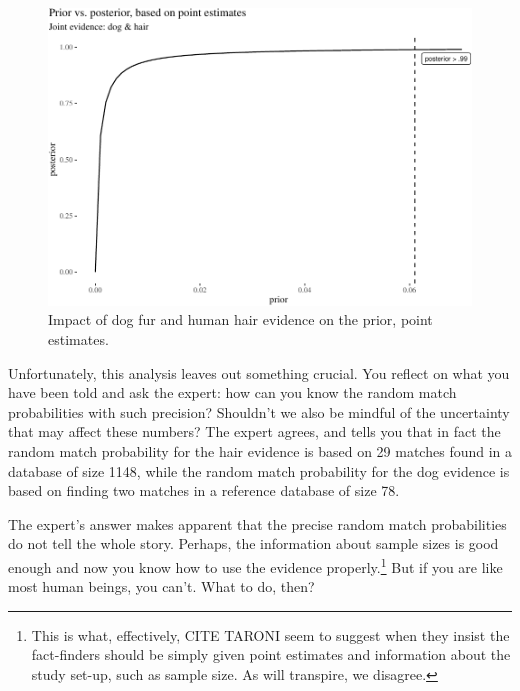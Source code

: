 \documentclass[
  10pt,
  dvipsnames,enabledeprecatedfontcommands]{scrartcl}
\begin{document}
\begin{figure}[H]

\begin{center}\includegraphics[width=0.6\linewidth]{imprecision_philosophical_paper._files/figure-latex/impactOfPoint4-1} \end{center}
\caption{Impact of dog fur and human hair evidence on the prior, point estimates.}
\label{fig:impactOfPoint}
\end{figure}

Unfortunately, this analysis leaves out something crucial. You reflect
on what you have been told and ask the expert: how can you know the
random match probabilities with such precision? Shouldn't we also be
mindful of the uncertainty that may affect these numbers? The expert
agrees, and tells you that in fact the random match probability for the
hair evidence is based on 29 matches found in a database of size 1148,
while the random match probability for the dog evidence is based on
finding two matches in a reference database of size 78.

The expert's answer makes apparent that the precise random match
probabilities do not tell the whole story. Perhaps, the information
about sample sizes is good enough and now you know how to use the
evidence properly.\footnote{This is what, effectively, CITE TARONI seem
  to suggest when they insist the fact-finders should be simply given
  point estimates and information about the study set-up, such as sample
  size. As will transpire, we disagree.} But if you are like most human
beings, you can't. What to do, then?\\
\end{document}
